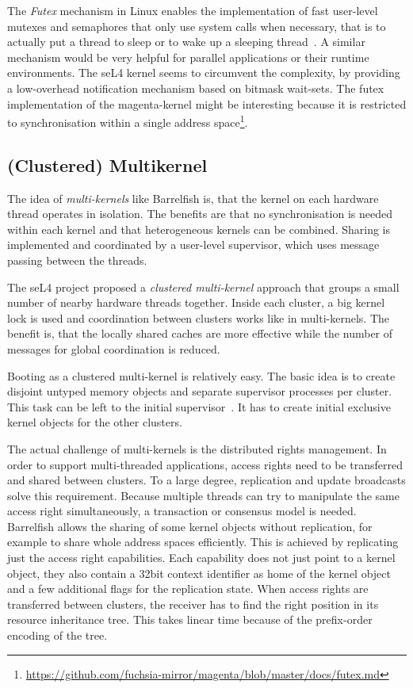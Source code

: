The \emph{Futex} mechanism in Linux enables the implementation of fast user-level mutexes and semaphores that only use system calls when necessary, that is to actually put a thread to sleep or to wake up a sleeping thread~\cite{drepper2009futexes,franke2002fuss}. A similar mechanism would be very helpful for parallel \mythos applications or their runtime environments. The seL4 kernel seems to circumvent the complexity, by providing a low-overhead notification mechanism based on bitmask wait-sets. The futex implementation of the magenta-kernel might be interesting because it is restricted to synchronisation within a single address space\footnote{\url{https://github.com/fuchsia-mirror/magenta/blob/master/docs/futex.md}}.

\subsection{(Clustered) Multikernel}
The idea of \emph{multi-kernels} like Barrelfish is, that the kernel on each hardware thread operates in isolation. The benefits are that no synchronisation is needed within each kernel and that heterogeneous kernels can be combined. Sharing is implemented and coordinated by a user-level supervisor, which uses message passing between the threads. 

The seL4 project proposed a \emph{clustered multi-kernel} approach that groups a small number of nearby hardware threads together. Inside each cluster, a big kernel lock is used and coordination between clusters works like in multi-kernels. The benefit is, that the locally shared caches are more effective while the number of messages for global coordination is reduced. 

Booting \mythos as a clustered multi-kernel is relatively easy. The basic idea is to create disjoint untyped memory objects and separate supervisor processes per cluster. This task can be left to the initial supervisor~\cite{Zellweger:2014:DCK:2685048.2685051}. It has to create initial exclusive kernel objects for the other clusters. 

The actual challenge of multi-kernels is the distributed rights management. In order to support multi-threaded applications, access rights need to be transferred and shared between clusters. To a large degree, replication and update broadcasts solve this requirement. Because multiple threads can try to manipulate the same access right simultaneously, a transaction or consensus model is needed. Barrelfish allows the sharing of some kernel objects without replication, for example to share whole address spaces efficiently. This is achieved by replicating just the access right capabilities. Each capability does not just point to a kernel object, they also contain a 32bit context identifier as home of the kernel object and a few additional flags for the replication state. When access rights are transferred between clusters, the receiver has to find the right position in its resource inheritance tree. This takes linear time because of the prefix-order encoding of the tree.

